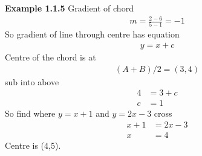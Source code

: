 \vspace{10mm}
\textbf{Example 1.1.5}
Gradient of chord
\begin{align*}
    m = \frac{2-6}{5-1} = -1
\end{align*}
So gradient of line through centre has equation
\begin{align*}
    y = x + c
\end{align*}
Centre of the chord is at 
\begin{align*}
(A+B)/2 = (3,4)
\end{align*}
sub into above
\begin{align*}
    4 &= 3 + c\\
    c &= 1
\end{align*}
So find where $y=x+1$ and $y=2x-3$ cross
\begin{align*}
    x+1 &= 2x-3\\
    x &= 4
\end{align*}
Centre is (4,5).